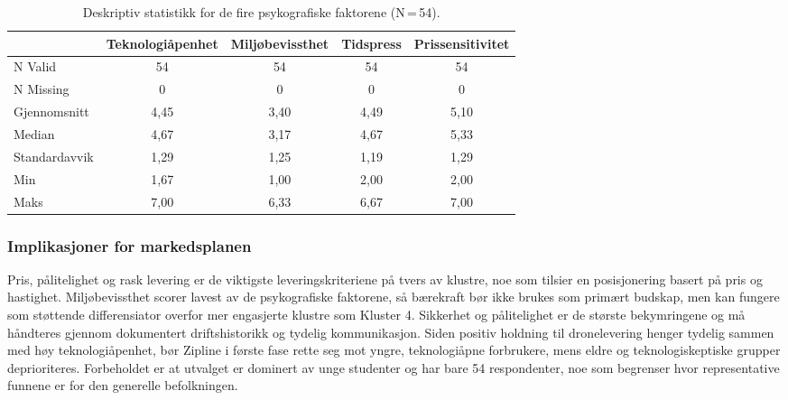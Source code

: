 \begin{table}[H]
\centering
\caption[]{Deskriptiv statistikk for de fire psykografiske faktorene
(N\,=\,54).}
\label{tab:faktor_statistikk}
\renewcommand{\arraystretch}{1.2}
\small
\begin{tabular}{@{} l c c c c @{}}
\toprule
 & \textbf{Teknologiåpenhet} & \textbf{Miljøbevissthet} & \textbf{Tidspress} & \textbf{Prissensitivitet} \\
\midrule
N Valid       & 54   & 54   & 54   & 54   \\
N Missing     & 0    & 0    & 0    & 0    \\
Gjennomsnitt  & 4,45 & 3,40 & 4,49 & 5,10 \\
Median        & 4,67 & 3,17 & 4,67 & 5,33 \\
Standardavvik & 1,29 & 1,25 & 1,19 & 1,29 \\
Min           & 1,67 & 1,00 & 2,00 & 2,00 \\
Maks          & 7,00 & 6,33 & 6,67 & 7,00 \\
\bottomrule
\end{tabular}
\end{table}

\subsubsection*{Implikasjoner for markedsplanen}

Pris, pålitelighet og rask levering er de viktigste leveringskriteriene
på tvers av klustre, noe som tilsier en posisjonering basert på pris og
hastighet. Miljøbevissthet scorer lavest av de psykografiske
faktorene, så bærekraft bør ikke brukes som primært budskap, men kan
fungere som støttende differensiator overfor mer engasjerte klustre som
Kluster 4. Sikkerhet og pålitelighet er de største bekymringene og må
håndteres gjennom dokumentert driftshistorikk og tydelig kommunikasjon.
Siden positiv holdning til dronelevering henger tydelig sammen med høy
teknologiåpenhet, bør Zipline i første fase rette seg mot yngre,
teknologiåpne forbrukere, mens eldre og teknologiskeptiske grupper
deprioriteres. Forbeholdet er at utvalget er dominert av unge studenter
og har bare 54 respondenter, noe som begrenser hvor
representative funnene er for den generelle befolkningen.
